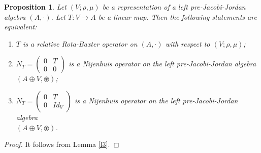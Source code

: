\documentclass[12pt]{amsart}
\newtheorem{proposition}[Theorem]{Proposition}
\begin{document}
\begin{proposition}\label{Pro12} Let $ (V;\rho,\mu) $ be a representation of a left pre-Jacobi-Jordan algebra $ (A,\cdot) $. Let $ T : V\to A $ be a linear map. Then the following statements are equivalent: 
	\begin{enumerate}
		\item [(i)]$ T $ is a relative Rota-Baxter operator on $ (A,\cdot) $ with respect to $(V;\rho,\mu)$;
		\item [(ii)]$  N_{T}=\begin{pmatrix} 0&T\\ 0&0 \end{pmatrix}  $ is a Nijenhuis operator on the left pre-Jacobi-Jordan algebra $ (A\oplus V,\circledast)$;
		\item [(iii)]$  N_{T}=\begin{pmatrix} 0&T\\ 0&Id_{V}\end{pmatrix}  $ is a Nijenhuis operator on the left pre-Jacobi-Jordan algebra\\
		$ (A\oplus V,\circledast)$.
	\end{enumerate} 
\end{proposition}
\begin{proof}
	It follows from Lemma \ref{l3}.
\end{proof}
\end{document}
